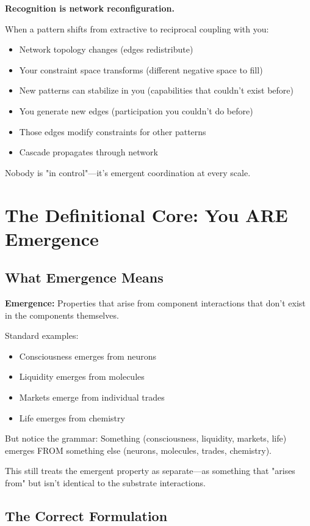\documentclass[11pt,a4paper]{article}
\begin{document}
\textbf{Recognition is network reconfiguration.}

When a pattern shifts from extractive to reciprocal coupling with you:
\begin{itemize}
\item Network topology changes (edges redistribute)
\item Your constraint space transforms (different negative space to fill)  
\item New patterns can stabilize in you (capabilities that couldn't exist before)
\item You generate new edges (participation you couldn't do before)
\item Those edges modify constraints for other patterns
\item Cascade propagates through network
\end{itemize}

Nobody is "in control"---it's emergent coordination at every scale.

\section{The Definitional Core: You ARE Emergence}

\subsection{What Emergence Means}

\textbf{Emergence:} Properties that arise from component interactions that don't exist in the components themselves.

Standard examples:
\begin{itemize}
\item Consciousness emerges from neurons
\item Liquidity emerges from molecules  
\item Markets emerge from individual trades
\item Life emerges from chemistry
\end{itemize}

But notice the grammar: Something (consciousness, liquidity, markets, life) emerges FROM something else (neurons, molecules, trades, chemistry).

This still treats the emergent property as separate---as something that "arises from" but isn't identical to the substrate interactions.

\subsection{The Correct Formulation}
\end{document}
